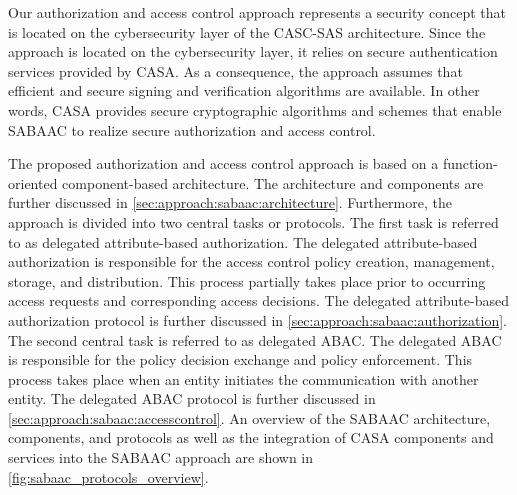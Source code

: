 Our authorization and access control approach represents a security concept that is located on the cybersecurity layer of the CASC-SAS architecture.
Since the approach is located on the cybersecurity layer, it relies on secure authentication services provided by CASA.
As a consequence, the approach assumes that efficient and secure signing and verification algorithms are available.
In other words, CASA provides secure cryptographic algorithms and schemes that enable SABAAC to realize secure authorization and access control.

The proposed authorization and access control approach is based on a function-oriented component-based architecture.
The architecture and components are further discussed in \autoref{sec:approach:sabaac:architecture}.
Furthermore, the approach is divided into two central tasks or protocols.
The first task is referred to as delegated attribute-based authorization.
The delegated attribute-based authorization is responsible for the access control policy creation, management, storage, and distribution.
This process partially takes place prior to occurring access requests and corresponding access decisions.
The delegated attribute-based authorization protocol is further discussed in \autoref{sec:approach:sabaac:authorization}.
The second central task is referred to as delegated ABAC.
The delegated ABAC is responsible for the policy decision exchange and policy enforcement.
This process takes place when an entity initiates the communication with another entity.
The delegated ABAC protocol is further discussed in \autoref{sec:approach:sabaac:accesscontrol}.
An overview of the SABAAC architecture, components, and protocols as well as the integration of CASA components and services into the SABAAC approach are shown in \autoref{fig:sabaac_protocols_overview}.
